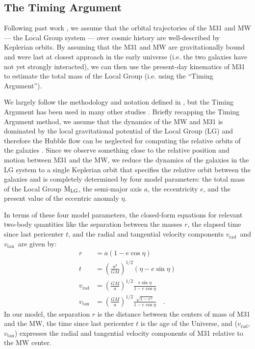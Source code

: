 \documentclass[twocolumn]{aastex631}
\newcommand{\mlg}{\ensuremath{\textrm{M}_{\rm LG}}}
\newcommand{\vtan}{\ensuremath{v_\textrm{tan}}}
\newcommand{\vrad}{\ensuremath{v_\textrm{rad}}}
\begin{document}
\subsection{The Timing Argument}

Following past work \citep[e.g.,][]{Lynden-Bell:1981, vdm2012, Penarrubia2016},
we assume that the orbital trajectories of the M31 and MW --- the Local Group
system --- over cosmic history are well-described by Keplerian orbits.
By assuming that the M31 and MW are gravitationally bound and were last at
closest approach in the early universe (i.e. the two galaxies have not yet
strongly interacted), we can then use the present-day kinematics of M31 to
estimate the total mass of the Local Group (i.e. using the ``Timing Argument'').

We largely follow the methodology and notation defined in
\citet{Penarrubia2016}, but the Timing Argument has been used in many other
studies \citep[e.g.,][]{stuff}.
Briefly recapping the Timing Argument method, we assume that the dynamics of the
MW and M31 is dominated by the local gravitational potential of the Local Group
(LG) and therefore the Hubble flow can be neglected for computing the relative
orbits of the galaxies \citep[see, e.g.,][]{someone}.
Since we observe something close to the relative position and motion between M31
and the MW, we reduce the dynamics of the galaxies in the LG system to a single
Keplerian orbit that specifies the relative orbit between the galaxies and is
completely determined by four model parameters: the total mass of the Local
Group \mlg, the semi-major axis $a$, the eccentricity $e$, and the present value
of the eccentric anomaly $\eta$.

In terms of these four model parameters, the closed-form equations for relevant
two-body quantities like the separation between the masses $r$, the elapsed time
since last pericenter $t$, and the radial and tangential velocity components
\vrad\ and \vtan\ are given by:
\begin{align}
  r &= a(1-e\cos\eta) \label{eq:r} \\
  t &= \left( \frac{a^3}{GM} \right)^{1/2}(\eta-e\sin\eta) \label{eq:t} \\
  \vrad &= \left( \frac{GM}{a} \right)^{1/2} \frac{e\sin\eta}{1-e\cos\eta} \label{eq:vrad} \\
  \vtan &= \left( \frac{GM}{a} \right)^{1/2} \frac{\sqrt{1-e^2}}{1-e\cos\eta} \label{eq:vtan} \quad .
\end{align}
In our model, the separation $r$ is the distance between the centers of mass of
M31 and the MW, the time since last pericenter $t$ is the age of the Universe,
and (\vrad, \vtan) expresses the radial and tangential velocity components of
M31 relative to the MW center.
\end{document}
